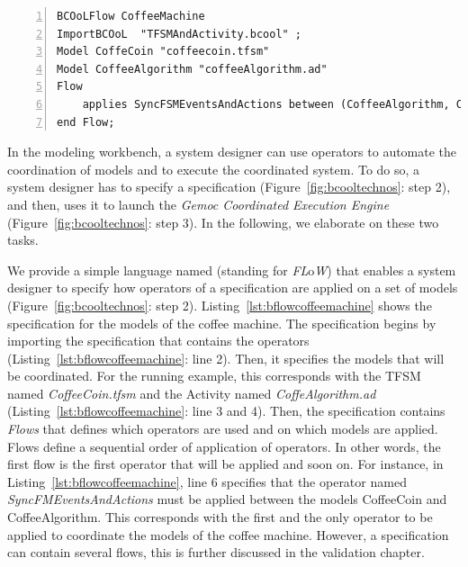 \begin{lstlisting}[language=bflow,
	caption={\bflow specification for the models of the coffee machine},
	label={lst:bflowcoffeemachine}, 
	basicstyle=\scriptsize\ttfamily, backgroundcolor=\color{LGrey}, numbers=left, xleftmargin=2pt]
BCOoLFlow CoffeeMachine
ImportBCOoL  "TFSMAndActivity.bcool" ;
Model CoffeCoin "coffeecoin.tfsm"
Model CoffeeAlgorithm "coffeeAlgorithm.ad"
Flow 
	applies SyncFSMEventsAndActions between (CoffeeAlgorithm, CoffeCoin);
end Flow;
	\end{lstlisting}

In the modeling workbench, a system designer can use \bcool operators to automate the coordination of models and to execute the coordinated system. To do so, a system designer has to specify a \bflow specification (Figure~\ref{fig:bcooltechnos}: step 2), and then, uses it to launch the \emph{Gemoc Coordinated Execution Engine} (Figure~\ref{fig:bcooltechnos}: step 3). In the following, we elaborate on these two tasks.  

We provide a simple language named \bflow (standing for \bcool \emph{FL}o\emph{W}) that enables a system designer to specify how operators of a \bcool specification are applied on a set of models (Figure~\ref{fig:bcooltechnos}: step 2). Listing~\ref{lst:bflowcoffeemachine} shows the \bflow specification for the models of the coffee machine. The \bflow specification begins by importing the \bcool specification that contains the operators (Listing~\ref{lst:bflowcoffeemachine}: line 2). Then, it specifies the models that will be coordinated. For the running example, this corresponds with the TFSM named \emph{CoffeeCoin.tfsm} and the Activity named \emph{CoffeAlgorithm.ad} (Listing~\ref{lst:bflowcoffeemachine}: line 3 and 4). Then, the specification contains \emph{Flows} that defines which operators are used and on which models are applied. Flows define a sequential order of application of operators. In other words, the first flow is the first operator that will be applied and soon on. For instance, in Listing~\ref{lst:bflowcoffeemachine}, line 6 specifies that the operator named \emph{SyncFMEventsAndActions} must be applied between the models CoffeeCoin and CoffeeAlgorithm. This corresponds with the first and the only operator to be applied to coordinate the models of the coffee machine. However, a \bflow specification can contain several flows, this is further discussed in the validation chapter.  

